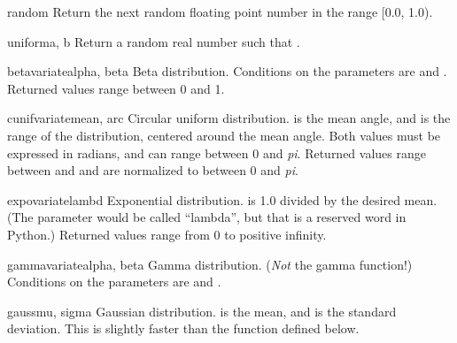 \begin{funcdesc}{random}{}
  Return the next random floating point number in the range [0.0, 1.0).
\end{funcdesc}

\begin{funcdesc}{uniform}{a, b}
  Return a random real number  such that
  .
\end{funcdesc}

\begin{funcdesc}{betavariate}{alpha, beta}
  Beta distribution.  Conditions on the parameters are
   and .
  Returned values range between 0 and 1.
\end{funcdesc}

\begin{funcdesc}{cunifvariate}{mean, arc}
  Circular uniform distribution.   is the mean angle, and
   is the range of the distribution, centered around the mean
  angle.  Both values must be expressed in radians, and can range
  between 0 and \emph{pi}.  Returned values range between
   and  and are normalized to between 0 and \emph{pi}.

\end{funcdesc}

\begin{funcdesc}{expovariate}{lambd}
  Exponential distribution.   is 1.0 divided by the desired
  mean.  (The parameter would be called ``lambda'', but that is a
  reserved word in Python.)  Returned values range from 0 to
  positive infinity.
\end{funcdesc}

\begin{funcdesc}{gammavariate}{alpha, beta}
  Gamma distribution.  (\emph{Not} the gamma function!)  Conditions on
  the parameters are  and .
\end{funcdesc}

\begin{funcdesc}{gauss}{mu, sigma}
  Gaussian distribution.   is the mean, and  is the
  standard deviation.  This is slightly faster than the
   function defined below.
\end{funcdesc}

